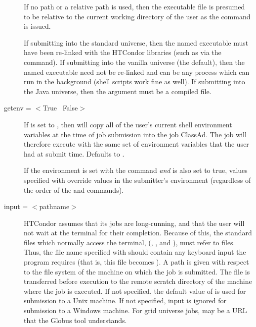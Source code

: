 \begin{description}
If no path or a relative path is used, then the executable file
is presumed to be relative
to the current working directory of the user as the
 command is issued.

If submitting into the standard universe, then the named executable
must have been re-linked with the HTCondor libraries (such as via the
 command). If submitting into the vanilla universe
(the default), then the named executable need not be re-linked and can
be any process which can run in the background (shell scripts work
fine as well).  If submitting into the Java universe, then the
argument must be a compiled  file.


\label{man-condor-submit-getenv}
\item[getenv = $<$True \Bar\ False$>$] 
If  is set to
, then  will copy all of the user's current
shell environment variables at the time of job submission into the job
ClassAd. The job will therefore execute with the same set of environment
variables that the user had at submit time. Defaults to .

If the environment is set with the  command \emph{and}
 is also set to true, values specified with
 override values in the submitter's environment
(regardless of the order of the  and 
commands).



\label{man-condor-submit-input}
\item[input = $<$pathname$>$]
HTCondor assumes that its jobs are
long-running, and that the user will not wait at the terminal for their
completion. Because of this, the standard files which normally access
the terminal, (, , and ),
must refer to files. Thus,
the file name specified with  should contain any keyboard
input the program requires (that is, this file becomes ).
A path is given with respect to the file system of the machine
on which the job is submitted.
The file is transferred before execution
to the remote scratch directory of the machine where the job is executed. 
If not specified, the default value
of  is used for submission to a Unix machine.
If not specified, input is ignored
for submission to a Windows machine.
For grid universe jobs,  may be a URL that the Globus
tool  understands.


\end{description}
